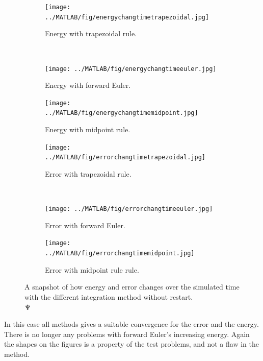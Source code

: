 \begin{figure}[H]
        \centering
        \begin{subfigure}[b]{0.30\textwidth}
                \texttt{[image: ../MATLAB/fig/energychangtimetrapezoidal.jpg]}
                \caption{ Energy with trapezoidal rule. }
                \label{fig:energychangtimetrapezoidal}
        \end{subfigure}%
        ~
        \begin{subfigure}[b]{0.30\textwidth}
                \texttt{[image: ../MATLAB/fig/energychangtimeeuler.jpg]}
                \caption{ Energy with forward Euler. }
                \label{fig:energychangtimeeuler}
        \end{subfigure}
        \begin{subfigure}[b]{0.30\textwidth}
                \texttt{[image: ../MATLAB/fig/energychangtimemidpoint.jpg]}
                \caption{ Energy with midpoint rule. }
                \label{fig:energychangtimemidpoint}
        \end{subfigure}
        
        \begin{subfigure}[b]{0.30\textwidth}
                \texttt{[image: ../MATLAB/fig/errorchangtimetrapezoidal.jpg]}
                \caption{ Error with trapezoidal rule. }
                \label{fig:errorchangtimetrapezoidal}
        \end{subfigure}%
        ~
        \begin{subfigure}[b]{0.30\textwidth}
                \texttt{[image: ../MATLAB/fig/errorchangtimeeuler.jpg]}
                \caption{ Error with forward Euler. }
                \label{fig:errorchangtimeeuler}
        \end{subfigure}
        \begin{subfigure}[b]{0.30\textwidth}
                \texttt{[image: ../MATLAB/fig/errorchangtimemidpoint.jpg]}
                \caption{ Error with midpoint rule rule. }
                \label{fig:errorchangtimemidpoint}
        \end{subfigure}
        \caption{A snapshot of how energy and error changes over the simulated time with the different integration method without restart.\\$\neptune$}
        \label{fig:errorchang}
\end{figure}
In this case all methods gives a suitable convergence for the error and the energy. There is no longer any problems with forward Euler's increasing energy. Again the shapes on the figures is a property of the test problems, and not a flaw in the method.


